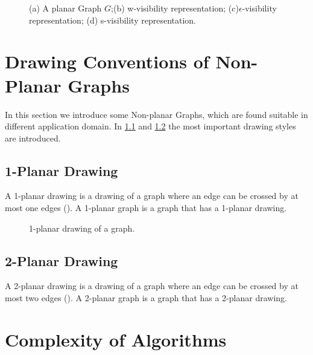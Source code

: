 \begin{figure}[!tb]
\centering
\resizebox{170mm}{!}{}
\caption{(a) A planar Graph $G$;(b) w-visibility representation; (c)${\epsilon}$-visibility representation; (d) s-visibility representation.}
\label{fig:visidraw}
\end{figure}




\section{Drawing Conventions of Non-Planar Graphs}
\label{dcng}

In this section we introduce some Non-planar Graphs, which are
found suitable in different application domain. In \ref{1pd} and \ref{2pd} the most important
drawing styles are introduced.






\subsection{1-Planar Drawing}
\label{1pd}

A 1-planar drawing is a drawing of a graph where an edge can be crossed by at most one edges (). A 1-planar graph is a graph that has a 1-planar drawing.



\begin{figure}[!tb]
\centering
\resizebox{40mm}{!}{}
\caption{1-planar drawing of a graph.}
\label{fig:1pd}
\end{figure}



\subsection{2-Planar Drawing}
\label{2pd}

A 2-planar drawing is a drawing of a graph where an edge can be crossed by at most two edges (). A 2-planar graph is a graph that has a 2-planar drawing.



\section{Complexity of Algorithms}
\label{complexity}

\endinput